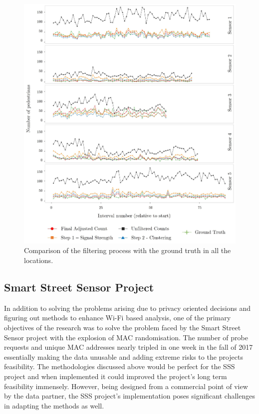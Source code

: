 \begin{figure}
  \includegraphics[trim=6 6 6 6, clip]{images/processing-pilot-results.jpg}
  \caption{Comparison of the filtering process with the ground truth in all the locations.}
  \label{figure:processing:pilot:final}
\end{figure}

\subsection{Smart Street Sensor Project}
In addition to solving the problems arising due to privacy oriented decisions and figuring out methods to enhance Wi-Fi based analysis, one of the primary objectives of the research was to solve the problem faced by the Smart Street Sensor project with the explosion of MAC randomisation.
The number of probe requests and unique MAC addresses nearly tripled in one week in the fall of 2017 essentially making the data unusable and adding extreme risks to the projects feasibility.
The methodologies discussed above would be perfect for the SSS project and when implemented it could improved the project's long term feasibility immensely.
However, being designed from a commercial point of view by the data partner, the SSS project's implementation poses significant challenges in adapting the methods as well.

